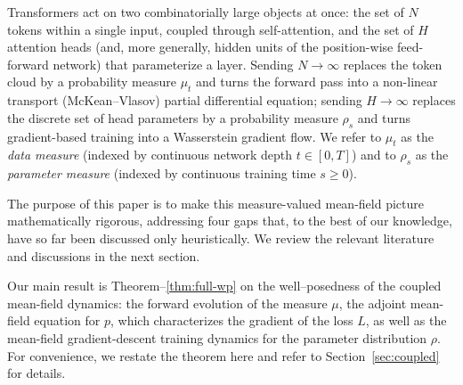 \documentclass[11pt,a4wide]{article}
\theoremstyle{definition}
\begin{document}
Transformers act on two combinatorially large objects at once: the set of $N$ tokens within a single input, coupled through self-attention, and the set of $H$ attention heads (and, more generally, hidden units of the position-wise feed-forward network) that parameterize a layer. Sending $N\to\infty$ replaces the token cloud by a probability measure $\mu_t$ and turns the forward pass into a non-linear transport (McKean--Vlasov) partial differential equation; sending $H\to\infty$ replaces the discrete set of head parameters by a probability measure $\rho_s$ and turns gradient-based training into a Wasserstein gradient flow. We refer to $\mu_t$ as the \emph{data measure} (indexed by continuous network depth $t\in[0,T]$) and to $\rho_s$ as the \emph{parameter measure} (indexed by continuous training time $s\ge0$).

The purpose of this paper is to make this measure-valued mean-field picture mathematically rigorous, addressing four gaps that, to the best of our knowledge, have so far  been discussed only heuristically.
We review the relevant literature and discussions in the next section. %

Our main result is Theorem–\ref{thm:full-wp} on the well--posedness of the coupled mean-field dynamics:  the forward evolution of  the measure  $\mu$, the adjoint mean-field equation for $p$,  which characterizes the gradient of the loss $L$, as well as the mean-field gradient-descent training dynamics for the parameter distribution $\rho.$  For convenience, we restate the theorem here and refer to Section~\ref{sec:coupled} for details. 
\end{document}
